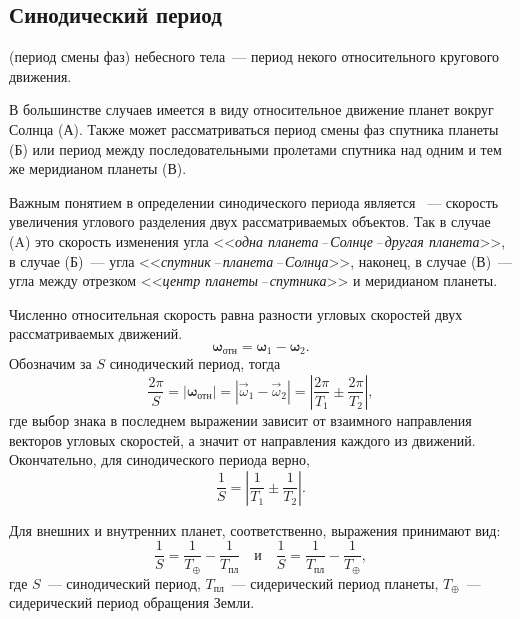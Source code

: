 \subsection{Синодический период}

 (период смены фаз) небесного тела~--- период некого относительного кругового движения.

В большинстве случаев имеется в виду относительное движение планет вокруг Солнца (А). Также может рассматриваться период смены фаз спутника планеты (Б) или период между последовательными пролетами спутника над одним и тем же меридианом планеты (В).

Важным понятием в определении синодического периода является ~--- скорость увеличения углового разделения двух рассматриваемых объектов. Так в случае (A) это скорость изменения угла <<{\slshape одна планета\,--\,Солнце\,--\,другая планета}>>, в случае (Б)~--- угла <<{\slshape спутник\,--\,планета\,--\,Солнца}>>, наконец, в случае (В)~--- угла между отрезком <<{\slshape центр планеты\,--\,спутника}>> и меридианом планеты.

Численно относительная скорость равна разности угловых скоростей двух рассматриваемых движений.
\begin{equation*}
    \boldsymbol\omega_\text{отн} = \boldsymbol{\omega}_1 - \boldsymbol\omega_2.
\end{equation*} 
Обозначим за $S$ синодический период, тогда
\begin{equation*}
    \frac{2\pi}{S} = |\boldsymbol\omega_\text{отн}| = |\vec\omega_1 - \vec\omega_2| = \left| \frac{2\pi}{T_1} \pm \frac{2\pi}{T_2} \right|,
\end{equation*}
где выбор знака в последнем выражении зависит от взаимного направления векторов угловых скоростей, а значит от направления каждого из движений. Окончательно, для синодического периода верно,
\begin{equation}
    \frac{1}{S} = \left| \frac{1}{T_1} \pm \frac{1}{T_2} \right|.
\end{equation}
    
Для внешних и внутренних планет, соответственно, выражения принимают вид:
\begin{equation} \frac{1}{S} = \frac{1}{T_\oplus} - \frac{1}{T_\text{пл}} \quad \text{и} \quad \frac{1}{S} = \frac{1}{T_\text{пл}} - \frac{1}{T_\oplus},
\end{equation}
где $S$~--- синодический период, $T_\text{пл}$~--- сидерический период планеты, $T_\oplus$~--- сидерический период обращения Земли.

